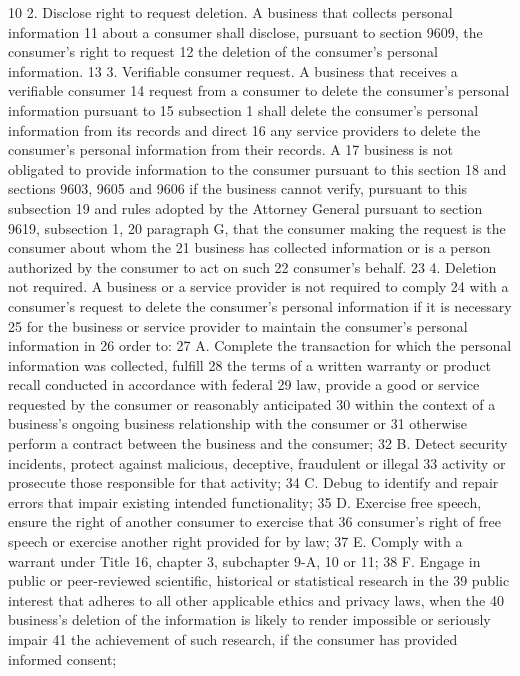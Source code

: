 10 2. Disclose right to request deletion. A business that collects personal information
11 about a consumer shall disclose, pursuant to section 9609, the consumer's right to request
12 the deletion of the consumer's personal information.
13 3. Verifiable consumer request. A business that receives a verifiable consumer
14 request from a consumer to delete the consumer's personal information pursuant to
15 subsection 1 shall delete the consumer's personal information from its records and direct
16 any service providers to delete the consumer's personal information from their records. A
17 business is not obligated to provide information to the consumer pursuant to this section
18 and sections 9603, 9605 and 9606 if the business cannot verify, pursuant to this subsection
19 and rules adopted by the Attorney General pursuant to section 9619, subsection 1,
20 paragraph G, that the consumer making the request is the consumer about whom the
21 business has collected information or is a person authorized by the consumer to act on such
22 consumer's behalf.
23 4. Deletion not required. A business or a service provider is not required to comply
24 with a consumer's request to delete the consumer's personal information if it is necessary
25 for the business or service provider to maintain the consumer's personal information in
26 order to:
27 A. Complete the transaction for which the personal information was collected, fulfill
28 the terms of a written warranty or product recall conducted in accordance with federal
29 law, provide a good or service requested by the consumer or reasonably anticipated
30 within the context of a business's ongoing business relationship with the consumer or
31 otherwise perform a contract between the business and the consumer;
32 B. Detect security incidents, protect against malicious, deceptive, fraudulent or illegal
33 activity or prosecute those responsible for that activity;
34 C. Debug to identify and repair errors that impair existing intended functionality;
35 D. Exercise free speech, ensure the right of another consumer to exercise that
36 consumer's right of free speech or exercise another right provided for by law;
37 E. Comply with a warrant under Title 16, chapter 3, subchapter 9-A, 10 or 11;
38 F. Engage in public or peer-reviewed scientific, historical or statistical research in the
39 public interest that adheres to all other applicable ethics and privacy laws, when the
40 business's deletion of the information is likely to render impossible or seriously impair
41 the achievement of such research, if the consumer has provided informed consent;
